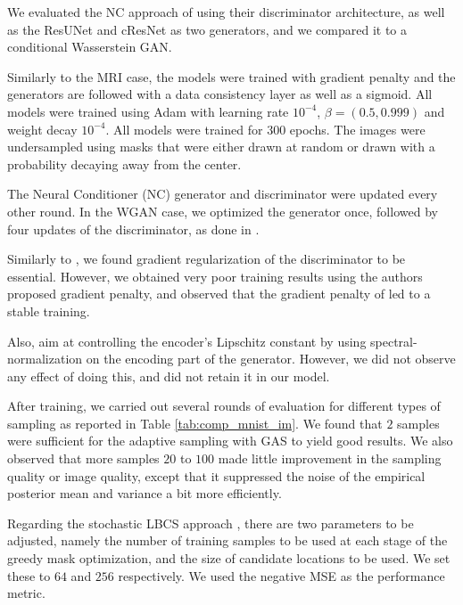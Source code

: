 We evaluated the NC approach of \citet{belghazi2019learning} using their discriminator architecture, as well as the ResUNet and cResNet as two generators, and we compared it to a conditional Wasserstein GAN. 

Similarly to the MRI case, the models were trained with gradient penalty \citep{gulrajani2017improved} and the generators are followed with a data consistency layer as well as a sigmoid. All models were trained using Adam \cite{kingma2014adam} with learning rate $10^{-4}$, $\beta=(0.5, 0.999)$ and weight decay $10^{-4}$. All models were trained for $300$ epochs. The images were undersampled using masks that were either drawn at random or drawn with a probability decaying away from the center.

The Neural Conditioner (NC) \cite{belghazi2019learning} generator and discriminator were updated every other round. In the WGAN case, we optimized the generator once, followed by four updates of the discriminator, as done in \cite{adler2018deep}.

\begin{remark}
    Similarly to \cite{belghazi2019learning}, we found gradient regularization of the discriminator to be essential. However, we obtained very poor training results using the authors proposed gradient penalty, and observed that the gradient penalty of \cite{gulrajani2017improved} led to a stable training. 
    
    Also, \citet{belghazi2019learning} aim at controlling the encoder's Lipschitz constant by using spectral-normalization on the encoding part of the generator. However, we did not observe any effect of doing this, and did not retain it in our model.
\end{remark}

After training, we carried out several rounds of evaluation for different types of sampling as reported in Table \ref{tab:comp_mnist_im}. We found that $2$ samples were sufficient for the adaptive sampling with GAS to yield good results. We also observed that more samples $20$ to $100$ made little improvement in the sampling quality or image quality, except that it suppressed the noise of the empirical posterior mean and variance a bit more efficiently.

Regarding the stochastic LBCS approach \citep{sanchez2019scalable}, there are two parameters to be adjusted, namely the number of training samples to be used at each stage of the greedy mask optimization, and the size of candidate locations to be used. We set these to $64$ and $256$ respectively. We used the negative MSE as the performance metric.

